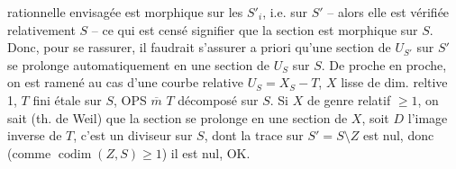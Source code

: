 rationnelle envisagée est morphique sur
les $S'_i$, i.e. sur $S'$ -- alors elle est
vérifiée relativement  $S$ -- ce qui
est censé signifier que la section est
morphique sur $S$. Donc, pour se
rassurer, il faudrait s'assurer a
priori qu'une section de $U_{S'}$ sur $S'$
se prolonge automatiquement en 
une section de $U_S$ sur $S$. De proche
en proche, on est ramené au cas
d'une courbe relative $U_S=X_S-T$,
$X$ lisse  de dim. reltive 1, $T$ fini étale
sur $S$,  OPS $\overline m$ $T$ décomposé sur $S$.
Si $X$ de genre relatif $\geq 1$, on sait
(th. de Weil) que la section se prolonge
en une section de $X$, soit $D$ l'image
inverse de $T$, c'est un diviseur sur $S$,
dont la trace sur $S'=S\setminus Z$ est nul, donc
(comme $\operatorname{codim}(Z,S)\geq 1$) il est nul, OK.

